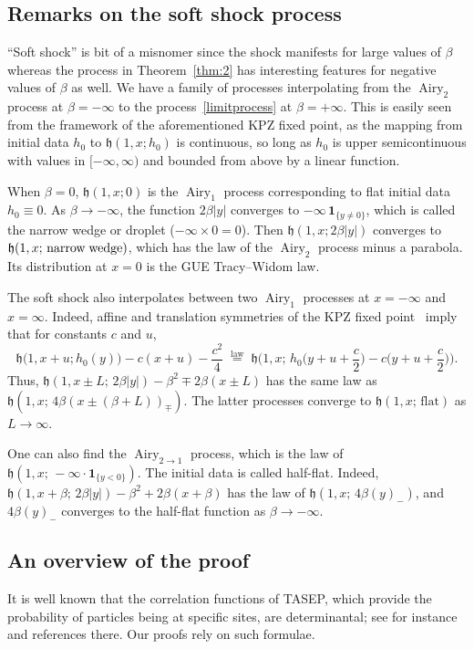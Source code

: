 \documentclass[10pt]{amsart}
\theoremstyle{definition}\newtheorem{defi}[theo]{Definition}\newtheorem{rema}[theo]{Remark}\newtheorem{exam}[theo]{Example}\newtheorem{exem}[theo]{Example}\newtheorem{nota}[theo]{Notation}
\DeclareMathOperator{\airy}{Airy}
\newcommand{\ind}[1]{\mathbf{1}_{\{ #1 \}}}
\newcommand{\h}{\mathfrak{h}}
\begin{document}
\subsection{Remarks on the soft shock process} \label{sec:shockremarks}
``Soft shock'' is bit of a misnomer since the shock manifests for large values of $\beta$ whereas the process in Theorem~\ref{thm:2} has interesting features for negative values of $\beta$ as well. We have a family of processes interpolating from the $\airy_2$ process at $\beta = -\infty$ to the process~\eqref{limitprocess} at $\beta = + \infty$. This is easily seen from the framework of the aforementioned KPZ fixed point, as the mapping from initial data $h_0$ to $\h(1,x; h_0)$ is continuous, so long as $h_0$ is upper semicontinuous with values in $[-\infty, \infty)$ and bounded from above by a linear function.

When $\beta = 0$, $\h(1,x; 0)$ is the $\airy_1$ process corresponding to flat initial data $h_0 \equiv 0$. As $\beta \to - \infty$, the function $2\beta|y|$ converges to $- \infty \, \ind{y \neq 0}$, which is called the narrow wedge or droplet ($-\infty \times 0 = 0$). Then $\h(1,x; 2\beta |y|)$ converges to $\h(1,x; \, \text{narrow\;wedge})$, which has the law of the $\airy_2$ process minus a parabola. Its distribution at $x = 0$ is the GUE Tracy--Widom law.

The soft shock also interpolates between two $\airy_1$ processes at $x = -\infty$ and $x = \infty$. Indeed, affine and translation symmetries of the KPZ fixed point~\cite[Theorem~4.5]{MQR} imply that for constants $c$ and $u$,
\[
\h \big(1,x+u; h_0(y) \big) -c(x+u)-\frac{c^2}{4} \;\overset{\text{law}}{=}\;
\h \bigg(1,x; \, h_0 \Big (y+u+\frac{c}{2} \Big) - c \Big (y+u+\frac{c}{2} \Big) \bigg).
\]
Thus, $\h(1,x \pm L; \, 2\beta|y|) - \beta^2 \mp 2\beta(x \pm L)$ has the same law as $\h (1,x; \,4 \beta (x \pm (\beta+L))_{\mp})$. The latter processes converge to $\h(1,x;\, \text{flat})$ as $L \to \infty$.

One can also find the $\airy_{2 \to 1}$ process, which is the law of $\h (1,x; \, - \infty \cdot \ind{y < 0})$. The initial data is called half-flat. Indeed, $\h (1,x+\beta; \, 2\beta|y|) - \beta^2 + 2\beta(x+\beta)$ has the law of $\h (1,x; \, 4\beta (y)_{-})$, and $4\beta (y)_{-}$ converges to the half-flat function as $\beta \to - \infty$.

\subsection{An overview of the proof} \label{sec:overview}
It is well known that the correlation functions of TASEP, which provide the probability of particles being at specific sites, are determinantal; see for instance~\cite{BFPS, BG} and references there. Our proofs rely on such formulae.
\end{document}
